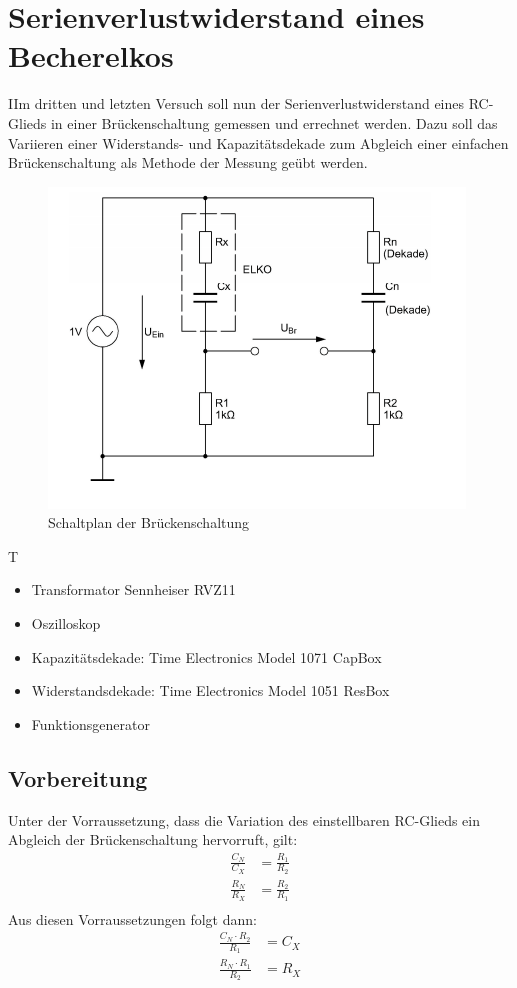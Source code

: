 \documentclass{article}
\begin{document}
\section{Serienverlustwiderstand eines Becherelkos}
\begin{task}
  IIm dritten und letzten Versuch soll nun der Serienverlustwiderstand eines RC-Glieds in einer Brückenschaltung gemessen und errechnet werden.
  Dazu soll das Variieren einer Widerstands- und Kapazitätsdekade zum Abgleich einer einfachen Brückenschaltung als Methode der Messung geübt werden.
\end{task}
\begin{figure}[h]
  \begin{center}
    \includegraphics[scale=0.8]{assets/images/Versuch3Schaltplan.PNG}
    \caption{Schaltplan der Brückenschaltung}
  \end{center}
\end{figure}
\begin{devlist}
  T
  \begin{itemize}
    \item Transformator Sennheiser RVZ11
    \item Oszilloskop 
    \item Kapazitätsdekade: Time Electronics Model 1071 CapBox
    \item Widerstandsdekade: Time Electronics Model 1051 ResBox
    \item Funktionsgenerator
  \end{itemize}
\end{devlist}
\subsection{Vorbereitung}
Unter der Vorraussetzung, dass die Variation des einstellbaren RC-Glieds ein Abgleich der Brückenschaltung hervorruft, gilt:
\begin{align*}
  \frac{C_N}{C_X} & = \frac{R_1}{R_2} \\
  \frac{R_N}{R_X} & = \frac{R_2}{R_1} \\
\end{align*}
Aus diesen Vorraussetzungen folgt dann:
\begin{align}
  \frac{C_N\cdot R_2}{R_1} & = C_X\label{eq:CX} \\
  \frac{R_N\cdot R_1}{R_2} & = R_X\label{eq:RX}
\end{align}
\end{document}
